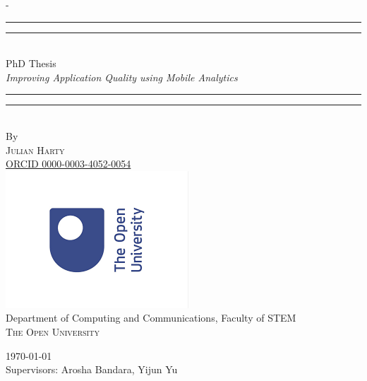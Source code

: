 \begin{titlingpage}
\begin{SingleSpace}
\calccentering{\unitlength} 
\begin{adjustwidth*}{\unitlength}{-\unitlength}
\vspace*{13mm}
\begin{center}
\rule[0.5ex]{\linewidth}{2pt}\vspace*{-\baselineskip}\vspace*{3.2pt}
\rule[0.5ex]{\linewidth}{1pt}\\[\baselineskip]
{\HUGE PhD Thesis}\\[4mm]
{\Large \textit{Improving Application Quality using Mobile Analytics}}\\
\rule[0.5ex]{\linewidth}{1pt}\vspace*{-\baselineskip}\vspace{3.2pt}
\rule[0.5ex]{\linewidth}{2pt}\\
\vspace{6.5mm}
{\large By}\\
\vspace{6.5mm}
{\large\textsc{Julian Harty}}\\
\href{https://orcid.org/0000-0003-4052-0054}{ORCID 0000-0003-4052-0054}\\
\vspace{11mm}
\includegraphics[scale=0.6]{images/ou-logo.png}\\
\vspace{6mm}
{\large Department of Computing and Communications, Faculty of STEM\\
\textsc{The Open University}}\\
\vspace{11mm}

\vspace{9mm}
{\large\textsc{\today}}\\
\vspace{12mm}
{\large Supervisors: Arosha Bandara, Yijun Yu}

\end{center}
\end{adjustwidth*}
\end{SingleSpace}
\end{titlingpage}